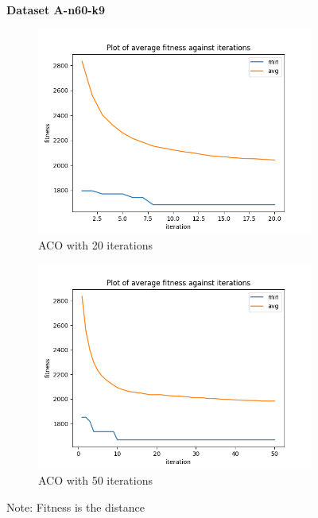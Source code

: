 \documentclass{article}
\begin{document}
\begin{figure}[H]
  \centering
  \textbf{Dataset A-n60-k9}
  \begin{subfigure}{.5\textwidth}
    \centering
    \includegraphics[width=1\linewidth]{images/n60-k9_20.png}
    \caption{ACO with 20 iterations}
    \label{fig:n60-k9_20}
  \end{subfigure}%
  \begin{subfigure}{.5\textwidth}
    \centering
    \includegraphics[width=1\linewidth]{images/n60-k9_50.png}
    \caption{ACO with 50 iterations}
    \label{fig:n60-k9_50}
  \end{subfigure}
  \caption{Note: Fitness is the distance}
  \label{fig:60-k9}
\end{figure}
\end{document}
